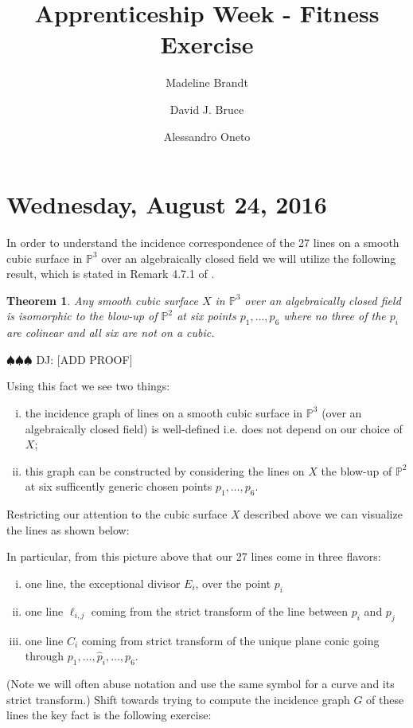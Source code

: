\documentclass[11pt]{amsart}
\title{Apprenticeship Week - Fitness Exercise}
\author{Madeline Brandt}
\author{David J. Bruce}
\author{Alessandro Oneto}
\newtheorem{theorem}[lemma]{Theorem}
\theoremstyle{remark}
\renewcommand{\P}{\mathbb{P}}
\newcommand{\deej}[1]{{\color{red} \sf $\spadesuit\spadesuit\spadesuit$ DJ: [#1]}}
\begin{document}
 
\maketitle
\tableofcontents


\section{Wednesday, August 24, 2016}

In order to understand the incidence correspondence of the 27 lines on a smooth cubic surface in $\P^3$ over an algebraically closed field we will utilize the following result, which is stated in Remark 4.7.1 of \cite{hartshorne}.

\begin{theorem}
Any smooth cubic surface $X$ in $\P^3$ over an algebraically closed field is isomorphic to the blow-up of $\P^2$ at six points $p_1,\ldots,p_6$ where no three of the $p_i$ are colinear and all six are not on a cubic.
\end{theorem}

\deej{ADD PROOF}

Using this fact we see two things:
\begin{enumerate}[(i)]
\item the incidence graph of lines on a smooth cubic surface in $\P^3$ (over an algebraically closed field) is well-defined i.e. does not depend on our choice of $X$;
\item this graph can be constructed by considering the lines on $X$ the blow-up of $\P^2$ at six sufficently generic chosen points $p_1,\ldots,p_6$. 
\end{enumerate}
Restricting our attention to the cubic surface $X$ described above we can visualize the lines as shown below:

In particular, from this picture above that our 27 lines come in three flavors:
\begin{enumerate}[(i)]
\item one line, the exceptional divisor $E_i$, over the point $p_i$ 
\item one line $\ell_{i,j}$ coming from the strict transform of the line between $p_i$ and $p_j$
\item one line $C_i$ coming from strict transform of the unique plane conic going through $p_1,\ldots,\hat{p}_i,\ldots,p_6$.
\end{enumerate}
(Note we will often abuse notation and use the same symbol for a curve and its strict transform.) Shift towards trying to compute the incidence graph $G$ of these lines the key fact is the following exercise:
\end{document}
